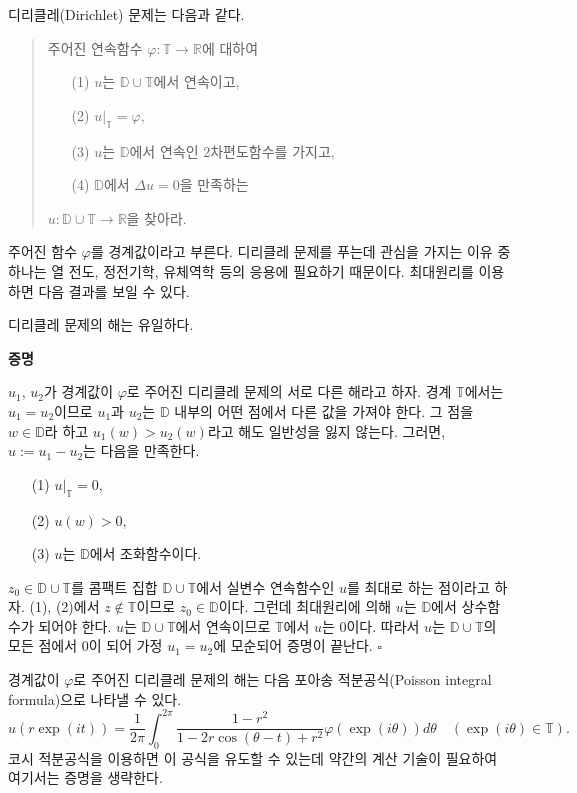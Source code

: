 디리클레(Dirichlet) 문제는 다음과 같다.
\begin{quote}
주어진 연속함수 $\varphi: \mathbb T \to \mathbb R$에 대하여
\begin{itemize}
\item[(1)] $u$는 $\mathbb D \cup \mathbb T$에서 연속이고,
\item[(2)] $u|_{\mathbb T}=\varphi$,
\item[(3)] $u$는 $\mathbb D$에서 연속인 $2$차편도함수를 가지고,
\item[(4)] $\mathbb D$에서 $\Delta u  = 0$을 만족하는
\end{itemize}
$u: \mathbb D \cup \mathbb T \to \mathbb R$을 찾아라.
\end{quote}

주어진 함수 $\varphi$를 경계값이라고 부른다.
디리클레 문제를 푸는데 관심을 가지는 이유 중 하나는
열 전도, 정전기학, 유체역학 등의 응용에 필요하기 때문이다.
최대원리를 이용하면 다음 결과를 보일 수 있다.

\begin{saltprop}{}{} \label{prpo-5-1}
디리클레 문제의 해는 유일하다.
\end{saltprop}

{\bf 증명}

$u_1$, $u_2$가 경계값이 $\varphi$로 주어진 디리클레 문제의 
서로 다른 해라고 하자. 경계 $\mathbb T$에서는 $u_1 = u_2$이므로
$u_1$과 $u_2$는 $\mathbb D$ 내부의 어떤 점에서 다른 값을 가져야 한다.
그 점을 $w\in\mathbb D$라 하고 $u_1(w) > u_2(w)$라고 해도 일반성을 잃지 않는다.
그러면, $u:=u_1 - u_2$는 다음을 만족한다.
\begin{itemize}
\item[(1)] $u|_{\mathbb T}=0$,
\item[(2)] $u(w)>0$,
\item[(3)] $u$는 $\mathbb D$에서 조화함수이다.
\end{itemize}
$z_0\in \mathbb D\cup \mathbb T$를
콤팩트 집합 $ \mathbb D\cup \mathbb T$에서
실변수 연속함수인 $u$를 최대로 하는 점이라고 하자.
(1), (2)에서 $z\not\in \mathbb T$이므로
$z_0\in \mathbb D$이다.
그런데 최대원리에 의해 $u$는 $\mathbb D$에서 상수함수가 되어야 한다.
$u$는  $ \mathbb D\cup \mathbb T$에서 연속이므로
$\mathbb T$에서 $u$는 $0$이다.
따라서 $u$는  $ \mathbb D\cup \mathbb T$의 모든 점에서 $0$이 되어
가정 $u_1 = u_2$에 모순되어 증명이 끝난다.
\hfill  $\square$

\begin{salt_remark}\label{rem-5-1}
경계값이 $\varphi$로 주어진 디리클레 문제의 해는 
다음 포아송 적분공식(Poisson integral formula)으로 나타낼 수 있다.
\[
u(r\exp(it)) = \dfrac1{2\pi} \int_0^{2\pi} 
\dfrac{1-r^2}{1-2r\cos(\theta -t) + r^2} \varphi(\exp(i\theta))d\theta
\quad (\exp(i\theta) \in \mathbb T).
\]
코시 적분공식을 이용하면 이 공식을 유도할 수 있는데
약간의 계산 기술이 필요하여 여기서는 증명을 생략한다.
\end{salt_remark}

